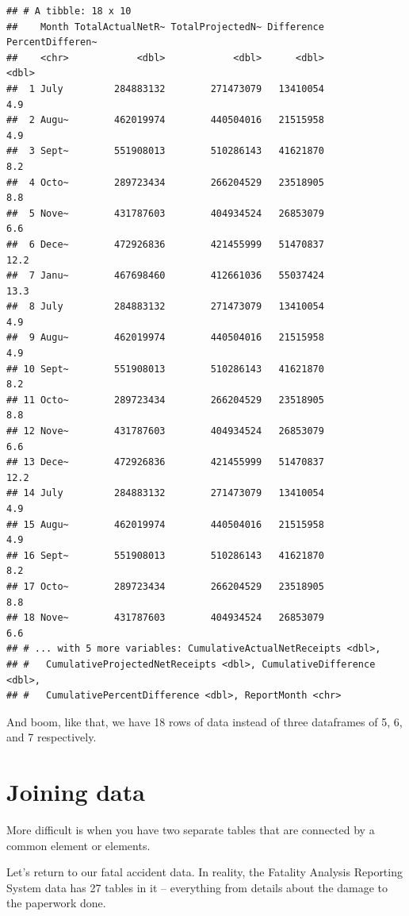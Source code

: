 \documentclass[]{book}
\begin{document}
\begin{verbatim}
## # A tibble: 18 x 10
##    Month TotalActualNetR~ TotalProjectedN~ Difference PercentDifferen~
##    <chr>            <dbl>            <dbl>      <dbl>            <dbl>
##  1 July         284883132        271473079   13410054              4.9
##  2 Augu~        462019974        440504016   21515958              4.9
##  3 Sept~        551908013        510286143   41621870              8.2
##  4 Octo~        289723434        266204529   23518905              8.8
##  5 Nove~        431787603        404934524   26853079              6.6
##  6 Dece~        472926836        421455999   51470837             12.2
##  7 Janu~        467698460        412661036   55037424             13.3
##  8 July         284883132        271473079   13410054              4.9
##  9 Augu~        462019974        440504016   21515958              4.9
## 10 Sept~        551908013        510286143   41621870              8.2
## 11 Octo~        289723434        266204529   23518905              8.8
## 12 Nove~        431787603        404934524   26853079              6.6
## 13 Dece~        472926836        421455999   51470837             12.2
## 14 July         284883132        271473079   13410054              4.9
## 15 Augu~        462019974        440504016   21515958              4.9
## 16 Sept~        551908013        510286143   41621870              8.2
## 17 Octo~        289723434        266204529   23518905              8.8
## 18 Nove~        431787603        404934524   26853079              6.6
## # ... with 5 more variables: CumulativeActualNetReceipts <dbl>,
## #   CumulativeProjectedNetReceipts <dbl>, CumulativeDifference <dbl>,
## #   CumulativePercentDifference <dbl>, ReportMonth <chr>
\end{verbatim}

And boom, like that, we have 18 rows of data instead of three dataframes of 5, 6, and 7 respectively.

\hypertarget{joining-data}{%
\section{Joining data}\label{joining-data}}

More difficult is when you have two separate tables that are connected by a common element or elements.

Let's return to our fatal accident data. In reality, the Fatality Analysis Reporting System data has 27 tables in it -- everything from details about the damage to the paperwork done.
\end{document}
